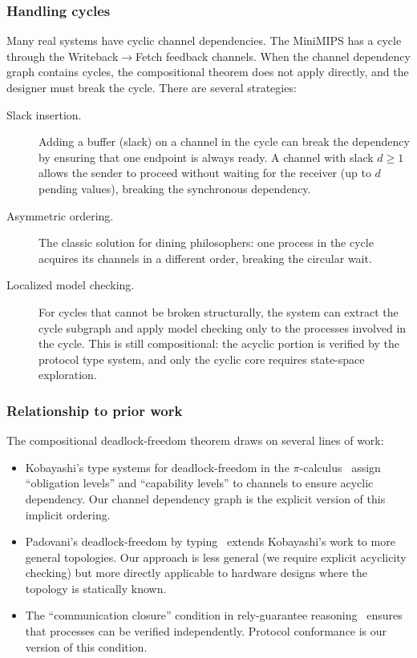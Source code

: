 \documentclass[11pt]{article}
\begin{document}
\subsubsection{Handling cycles}

Many real systems have cyclic channel dependencies.  The MiniMIPS has
a cycle through the Writeback$\to$Fetch feedback channels.  When the
channel dependency graph contains cycles, the compositional theorem
does not apply directly, and the designer must break the cycle.
There are several strategies:

\begin{description}
\item[Slack insertion.]
  Adding a buffer (slack) on a channel in the cycle can break the
  dependency by ensuring that one endpoint is always ready.  A channel
  with slack $d \geq 1$ allows the sender to proceed without waiting
  for the receiver (up to $d$ pending values), breaking the
  synchronous dependency.

\item[Asymmetric ordering.]
  The classic solution for dining philosophers: one process in the
  cycle acquires its channels in a different order, breaking the
  circular wait.

\item[Localized model checking.]
  For cycles that cannot be broken structurally, the system can
  extract the cycle subgraph and apply model checking only to the
  processes involved in the cycle.  This is still compositional: the
  acyclic portion is verified by the protocol type system, and only the
  cyclic core requires state-space exploration.
\end{description}

\subsubsection{Relationship to prior work}

The compositional deadlock-freedom theorem draws on several lines of
work:

\begin{itemize}
\item Kobayashi's type systems for deadlock-freedom in the
  $\pi$-calculus~\cite{kobayashi2006} assign ``obligation levels'' and
  ``capability levels'' to channels to ensure acyclic dependency.  Our
  channel dependency graph is the explicit version of this implicit
  ordering.

\item Padovani's deadlock-freedom by typing~\cite{padovani2014}
  extends Kobayashi's work to more general topologies.  Our approach
  is less general (we require explicit acyclicity checking) but more
  directly applicable to hardware designs where the topology is
  statically known.

\item The ``communication closure'' condition in rely-guarantee
  reasoning~\cite{jones1983} ensures that processes can be verified
  independently.  Protocol conformance is our version of this
  condition.
\end{itemize}
\end{document}
